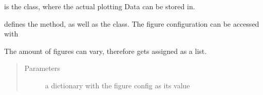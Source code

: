 \documentclass[letterpaper,10pt,english]{sphinxmanual}
\begin{document}
\begin{fulllineitems}
\begin{fulllineitems}
\begin{quote}
\begin{description}
\end{description}\end{quote}

\begin{fulllineitems}
\label{\detokenize{DataAnalyzer.Data:DataAnalyzer.Data.cl_data.FileData.PlotData.Data}}
 is the class, where the actual plotting Data can be stored in.

\end{fulllineitems}


\begin{fulllineitems}
\label{\detokenize{DataAnalyzer.Data:DataAnalyzer.Data.cl_data.FileData.PlotData.Figure}}
 defines the  method, as well as the  class.
The figure configuration can be accessed with 

The amount of figures can vary, therefore  gets assigned as a list.
\begin{quote}\begin{description}
\item[{Parameters}] \leavevmode
{} \textendash{} a dictionary with the figure config as its value

\end{description}\end{quote}


\end{fulllineitems}
\end{fulllineitems}
\end{fulllineitems}
\end{document}
